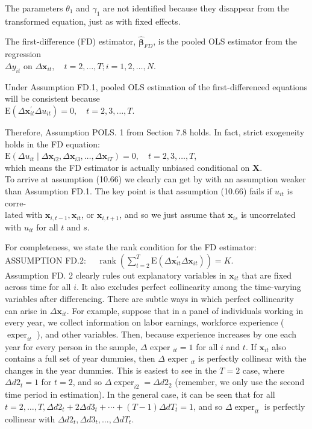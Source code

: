 \documentclass[10pt]{article}
\begin{document}
The parameters $\theta_{1}$ and $\gamma_{1}$ are not identified because they disappear from the transformed equation, just as with fixed effects.

The first-difference (FD) estimator, $\hat{\boldsymbol{\beta}}_{F D}$, is the pooled OLS estimator from the regression\\
$\Delta y_{i t}$ on $\Delta \mathbf{x}_{i t}, \quad t=2, \ldots, T ; i=1,2, \ldots, N$.

Under Assumption FD.1, pooled OLS estimation of the first-differenced equations will be consistent because\\
$\mathrm{E}\left(\Delta \mathbf{x}_{i t}^{\prime} \Delta u_{i t}\right)=0, \quad t=2,3, \ldots, T$.

Therefore, Assumption POLS. 1 from Section 7.8 holds. In fact, strict exogeneity holds in the FD equation:\\
$\mathrm{E}\left(\Delta u_{i t} \mid \Delta \mathbf{x}_{i 2}, \Delta \mathbf{x}_{i 3}, \ldots, \Delta \mathbf{x}_{i T}\right)=0, \quad t=2,3, \ldots, T$,\\
which means the FD estimator is actually unbiased conditional on $\mathbf{X}$.\\
To arrive at assumption (10.66) we clearly can get by with an assumption weaker than Assumption FD.1. The key point is that assumption (10.66) fails if $u_{i t}$ is corre-\\
lated with $\mathbf{x}_{i, t-1}, \mathbf{x}_{i t}$, or $\mathbf{x}_{i, t+1}$, and so we just assume that $\mathbf{x}_{i s}$ is uncorrelated with $u_{i t}$ for all $t$ and $s$.

For completeness, we state the rank condition for the FD estimator:\\
ASSUMPTION FD.2: $\quad \operatorname{rank}\left(\sum_{t=2}^{T} \mathrm{E}\left(\Delta \mathbf{x}_{i t}^{\prime} \Delta \mathbf{x}_{i t}\right)\right)=K$.\\
Assumption FD. 2 clearly rules out explanatory variables in $\mathbf{x}_{i t}$ that are fixed across time for all $i$. It also excludes perfect collinearity among the time-varying variables after differencing. There are subtle ways in which perfect collinearity can arise in $\Delta \mathbf{x}_{i t}$. For example, suppose that in a panel of individuals working in every year, we collect information on labor earnings, workforce experience ( $\operatorname{exper}_{i t}$ ), and other variables. Then, because experience increases by one each year for every person in the sample, $\Delta$ exper $_{i t}=1$ for all $i$ and $t$. If $\mathbf{x}_{i t}$ also contains a full set of year dummies, then $\Delta$ exper $_{i t}$ is perfectly collinear with the changes in the year dummies. This is easiest to see in the $T=2$ case, where $\Delta d 2_{t}=1$ for $t=2$, and so $\Delta \operatorname{exper}_{i 2}=\Delta d 2_{2}$ (remember, we only use the second time period in estimation). In the general case, it can be seen that for all $t=2, \ldots, T, \Delta d 2_{t}+2 \Delta d 3_{t}+\cdots+(T-1) \Delta d T_{t}=1$, and so $\Delta \operatorname{exper}_{i t}$ is perfectly collinear with $\Delta d 2_{t}, \Delta d 3_{t}, \ldots, \Delta d T_{t}$.
\end{document}
